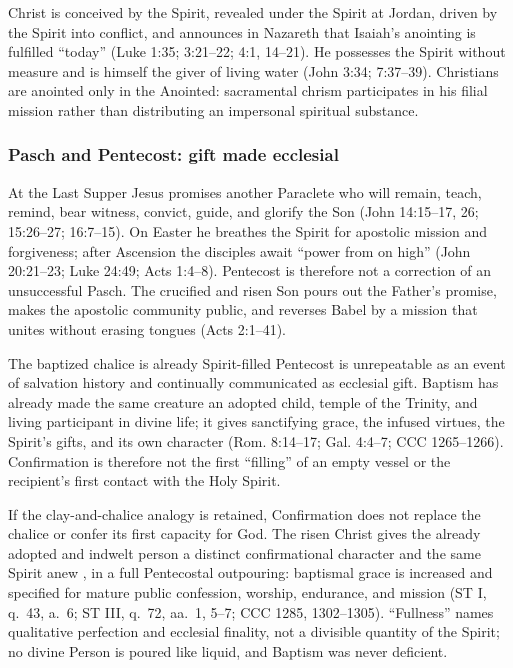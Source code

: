 Christ is conceived by the Spirit, revealed under the Spirit at Jordan, driven by the Spirit into conflict, and announces in Nazareth that Isaiah's anointing is fulfilled ``today'' (Luke 1:35; 3:21--22; 4:1, 14--21). He possesses the Spirit without measure and is himself the giver of living water (John 3:34; 7:37--39). Christians are anointed only in the Anointed: sacramental chrism participates in his filial mission rather than distributing an impersonal spiritual substance.

\subsubsection{Pasch and Pentecost: gift made ecclesial}

At the Last Supper Jesus promises another Paraclete who will remain, teach, remind, bear witness, convict, guide, and glorify the Son (John 14:15--17, 26; 15:26--27; 16:7--15). On Easter he breathes the Spirit for apostolic mission and forgiveness; after Ascension the disciples await ``power from on high'' (John 20:21--23; Luke 24:49; Acts 1:4--8). Pentecost is therefore not a correction of an unsuccessful Pasch. The crucified and risen Son pours out the Father's promise, makes the apostolic community public, and reverses Babel by a mission that unites without erasing tongues (Acts 2:1--41).

\begin{studybox}{The baptized chalice is already Spirit-filled}
Pentecost is unrepeatable as an event of salvation history and continually communicated as ecclesial gift. Baptism has already made the same creature an adopted child, temple of the Trinity, and living participant in divine life; it gives sanctifying grace, the infused virtues, the Spirit's gifts, and its own character (Rom. 8:14--17; Gal. 4:4--7; CCC 1265--1266). Confirmation is therefore not the first ``filling'' of an empty vessel or the recipient's first contact with the Holy Spirit.

If the clay-and-chalice analogy is retained, Confirmation does not replace the chalice or confer its first capacity for God. The risen Christ gives the already adopted and indwelt person a distinct confirmational character and the same Spirit anew , in a full Pentecostal outpouring: baptismal grace is increased and specified for mature public confession, worship, endurance, and mission (ST I, q.~43, a.~6; ST III, q.~72, aa.~1, 5--7; CCC 1285, 1302--1305). ``Fullness'' names qualitative perfection and ecclesial finality, not a divisible quantity of the Spirit; no divine Person is poured like liquid, and Baptism was never deficient.
\end{studybox}

